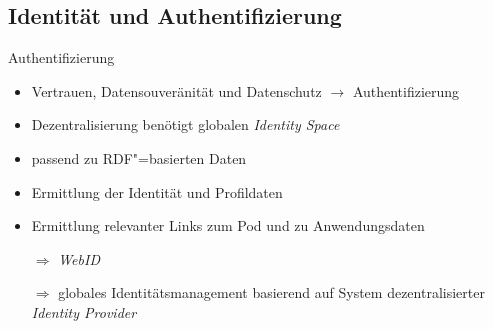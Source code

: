 



\subsection{Identität und Authentifizierung}

\begin{frame}{Authentifizierung \footnotesize\cite{sambraSolidPlatformDecentralized2016}}
    \begin{itemize}
        \item Vertrauen, Datensouveränität und Datenschutz $\to$ Authentifizierung
        \item Dezentralisierung benötigt globalen \emph{Identity Space}
        
        \pause
        \item passend zu RDF"=basierten Daten
        \item Ermittlung der Identität und Profildaten
        \item Ermittlung relevanter Links zum Pod und zu Anwendungsdaten
        
        \pause
        \item[$\Rightarrow$] \emph{WebID}
        \item[$\Rightarrow$] globales Identitätsmanagement basierend auf System dezentralisierter \emph{Identity Provider}
    \end{itemize}
\end{frame}


